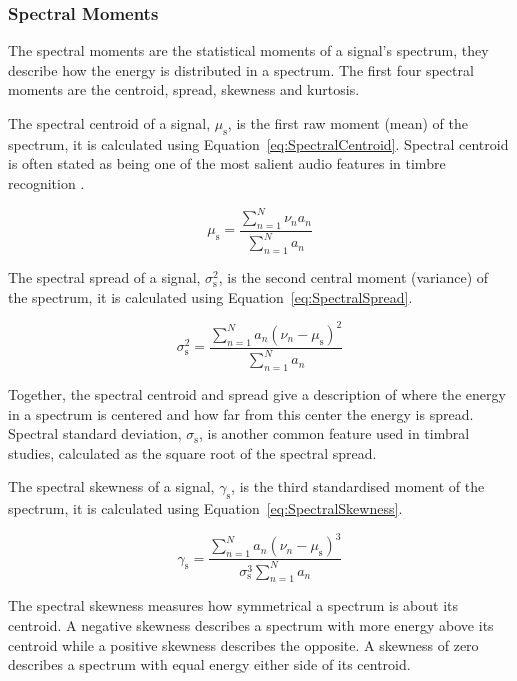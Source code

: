 		\subsubsection*{Spectral Moments}
			The spectral moments are the statistical moments of a signal's spectrum, they describe how the
			energy is distributed in a spectrum. The first four spectral moments are the centroid, spread,
			skewness and kurtosis.

			The spectral centroid of a signal, $\mu_{\mathrm{s}}$, is the first raw moment (mean) of the
			spectrum, it is calculated using Equation~\ref{eq:SpectralCentroid}. Spectral centroid is often
			stated as being one of the most salient audio features in timbre recognition
			\citep{freed1990auditory, lakatos2000a}. 

			\begin{equation}
				\mu_{\mathrm{s}} = \frac{\sum_{n = 1}^{N} \nu_{n}a_{n}}
					   	   {\sum_{n = 1}^{N} a_{n}}
				\label{eq:SpectralCentroid}
			\end{equation}

			The spectral spread of a signal, $\sigma_{\mathrm{s}}^{2}$, is the second central moment (variance)
			of the spectrum, it is calculated using Equation~\ref{eq:SpectralSpread}.

			\begin{equation}
				\sigma_{\mathrm{s}}^{2} = \frac{\sum_{n = 1}^{N} a_{n}(\nu_{n} - \mu_{\mathrm{s}})^{2}}
						  	  {\sum_{n = 1}^{N} a_{n}}
				\label{eq:SpectralSpread}
			\end{equation}

			Together, the spectral centroid and spread give a description of where the energy in a spectrum is
			centered and how far from this center the energy is spread. Spectral standard deviation,
			$\sigma_{\mathrm{s}}$, is another common feature used in timbral studies, calculated as the square
			root of the spectral spread.

			The spectral skewness of a signal, $\gamma_{\mathrm{s}}$, is the third standardised moment of the
			spectrum, it is calculated using Equation~\ref{eq:SpectralSkewness}.

			\begin{equation}
				\gamma_{\mathrm{s}} = \frac{\sum_{n = 1}^{N} a_{n}(\nu_{n} - \mu_{\mathrm{s}})^{3}}
					{\sigma_{\mathrm{s}}^{3}\sum_{n = 1}^{N} a_{n}}
				\label{eq:SpectralSkewness}
			\end{equation}

			The spectral skewness measures how symmetrical a spectrum is about its centroid. A negative
			skewness describes a spectrum with more energy above its centroid while a positive skewness
			describes the opposite. A skewness of zero describes a spectrum with equal energy either side of
			its centroid.


